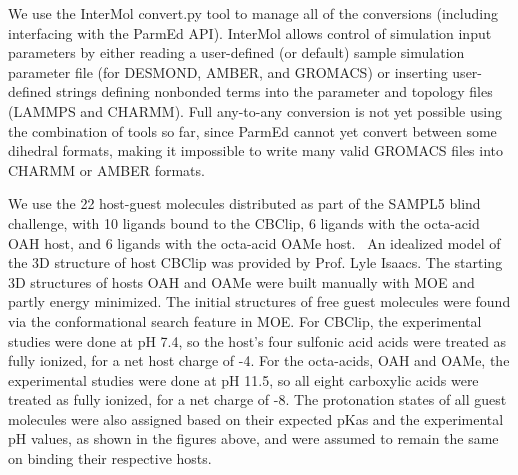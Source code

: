 We use the InterMol convert.py tool to manage all of the conversions
(including interfacing with the ParmEd API). InterMol allows control
of simulation input parameters by either reading a user-defined (or
default) sample simulation parameter file (for DESMOND, AMBER, and
GROMACS) or inserting user-defined strings defining nonbonded terms
into the parameter and topology files (LAMMPS and CHARMM). Full
any-to-any conversion is not yet possible using the combination of
tools so far, since ParmEd cannot yet convert between some dihedral
formats, making it impossible to write many valid GROMACS files into
CHARMM or AMBER formats.

We use the 22 host-guest molecules distributed as part of the SAMPL5
blind challenge, with 10 ligands bound to the CBClip, 6 ligands with
the octa-acid OAH host, and 6 ligands with the octa-acid OAMe
host.~\cite{mainSAMPL5paper} An idealized model of the 3D structure
of host CBClip was provided by Prof. Lyle Isaacs. The starting 3D
structures of hosts OAH and OAMe were built manually with MOE and
partly energy minimized. The initial structures of free guest
molecules were found via the conformational search feature in MOE. For
CBClip, the experimental studies were done at pH 7.4, so the host's
four sulfonic acid acids were treated as fully ionized, for a net host
charge of -4.  For the octa-acids, OAH and OAMe, the experimental
studies were done at pH 11.5, so all eight carboxylic acids were
treated as fully ionized, for a net charge of -8. The protonation
states of all guest molecules were also assigned based on their
expected pKas and the experimental pH values, as shown in the figures
above, and were assumed to remain the same on binding their respective
hosts.


